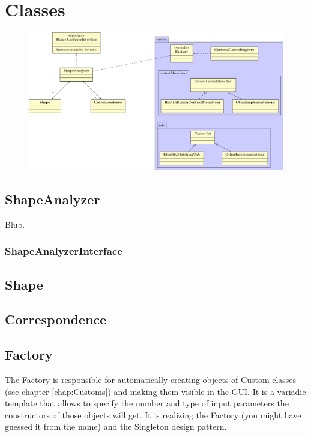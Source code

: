 
\chapter{Classes}

\begin{figure}[h]
	\centering
	\includegraphics[width=\textwidth]{images/diagram.pdf}
\end{figure}

\section{ShapeAnalyzer}
\label{sec:ShapeAnalyzer}

Blub.

\subsection{ShapeAnalyzerInterface}
\label{subsec:ShapeAnalyzerInterface}

\section{Shape}
\label{sec:Shape}

\section{Correspondence}
\label{sec:Correspondence}

\section{Factory}
\label{sec:Factory}

The Factory is responsible for automatically creating objects of Custom classes (see chapter \ref{chap:Customs}) and making them visible in the GUI. It is a variadic template that allows to specify the number and type of input parameters the constructors of those objects will get. It is realizing the Factory (you might have guessed it from the name) and the Singleton design pattern. 

